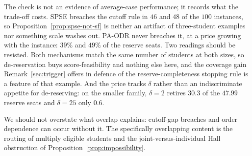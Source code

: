 \documentclass[a4paper,twoside]{article}
\theoremstyle{definition}
\renewcommand{\T}{\mathcal{T}}
\begin{document}
The check is not an evidence of average-case performance; it records what the trade-off costs. SPSE breaches the cutoff rule in $46$ and $48$ of the $100$ instances, so Proposition~\ref{prop:spse-not-sf} is neither an artifact of three-student examples nor something scale washes out. PA-ODR never breaches it, at a price growing with the instance: $39\%$ and $49\%$ of the reserve seats. Two readings should be resisted. Both mechanisms match the same number of students at both sizes, so de-reservation buys score-feasibility and nothing else here, and the coverage gain Remark~\ref{sec:trigger} offers in defence of the reserve-completeness stopping rule is a feature of that example. And the price tracks $\delta$ rather than an indiscriminate appetite for de-reserving: on the smaller family, $\delta=2$ retires $30.3$ of the $47.99$ reserve seats and $\delta=25$ only $0.6$.


We should not overstate what overlap explains: cutoff-gap breaches and order dependence can occur without it. The specifically overlapping content is the routing of multiply eligible students and the joint-versus-individual Hall obstruction of Proposition~\ref{prop:impossibility}.




\end{document}
